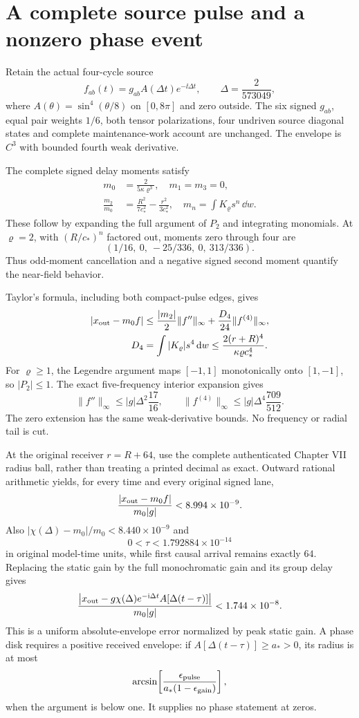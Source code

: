 \section{A complete source pulse and a nonzero phase event}
Retain the actual four-cycle source
\[
 f_{ab}(t)=g_{ab}A(\Delta t)e^{-\ii\Delta t},\qquad
 \Delta=\frac2{573049},
\]
where $A(\theta)=\sin^4(\theta/8)$ on $[0,8\pi]$ and zero outside. The six signed $g_{ab}$, equal pair weights $1/6$, both tensor polarizations, four undriven source diagonal states and complete maintenance-work account are unchanged. The envelope is $C^3$ with bounded fourth weak derivative.

The complete signed delay moments satisfy
\[
\begin{split}
 m_0&=\frac2{5\kappa\varrho^3},\quad m_1=m_3=0,\\
 \frac{m_2}{m_0}&=\frac{R^2}{7c_*^2}-\frac{r^2}{3c_*^2},\quad
 m_n=\int K_{\varrho}s^n\,\dd w.
\end{split}
\]
These follow by expanding the full argument of $P_2$ and integrating monomials. At $\varrho=2$, with $(R/c_*)^n$ factored out, moments zero through four are
\[
 (1/16,\ 0,\ -25/336,\ 0,\ 313/336).
\]
Thus odd-moment cancellation and a negative signed second moment quantify the near-field behavior.

Taylor's formula, including both compact-pulse edges, gives
\[
\begin{split}
 |x_{\rm out}-m_0f|
 &\le\frac{|m_2|}2\|f''\|_\infty
       +\frac{D_4}{24}\|f^{(4)}\|_\infty,\\
 D_4&=\int|K_{\varrho}|s^4\,\mathrm{d} w
 \le\frac{2(r+R)^4}{\kappa\varrho c_*^4}.
\end{split}
\]
For $\varrho\ge1$, the Legendre argument maps $[-1,1]$ monotonically onto $[1,-1]$, so $|P_2|\le1$. The exact five-frequency interior expansion gives
\[
 \|f''\|_\infty\le|g|\Delta^2\frac{17}{16},\qquad
 \|f^{(4)}\|_\infty\le|g|\Delta^4\frac{709}{512}.
\]
The zero extension has the same weak-derivative bounds. No frequency or radial tail is cut.

At the original receiver $r=R+64$, use the complete authenticated Chapter VII radius ball, rather than treating a printed decimal as exact. Outward rational arithmetic yields, for every time and every original signed lane,
\[
 \frac{|x_{\rm out}-m_0f|}{m_0|g|}<8.994\times10^{-9}.
\]
Also $|\chi(\Delta)-m_0|/m_0<8.440\times10^{-9}$ and
\[
 0<\tau<1.792884\times10^{-14}
\]
in original model-time units, while first causal arrival remains exactly $64$. Replacing the static gain by the full monochromatic gain and its group delay gives
\[
 \frac{\left|x_{\rm out}-g\chi(\Delta)e^{-\mathrm{i}\Delta t}
 A[\Delta(t-\tau)]\right|}{m_0|g|}
 <1.744\times10^{-8}.
\]
This is a uniform absolute-envelope error normalized by peak static gain. A phase disk requires a positive received envelope: if $A[\Delta(t-\tau)]\ge a_*>0$, its radius is at most
\[
 \arcsin\!\left[\frac{\epsilon_{\rm pulse}}
 {a_*(1-\epsilon_{\rm gain})}\right],
\]
when the argument is below one. It supplies no phase statement at zeros.

